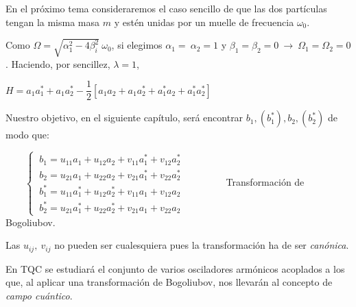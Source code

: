 \vspace{5mm}
\begin{ejercicio}
En el próximo tema consideraremos el caso sencillo de que las dos partículas tengan la misma masa $m$ y estén unidas por un muelle de frecuencia $\omega_0$.

Como $\Omega=\sqrt{\alpha_1^2-4\beta_i^2}\ \omega_0$, si elegimos $\alpha_1=\ \alpha_2=1$ y $\beta_1=\beta_2=0 \ \to \ \Omega_1=\Omega_2=0$. Haciendo, por sencillez, $\lambda=1$,

 $H=a_1a_1^*+a_1a_2^*-\dfrac 1 2 [a_1a_2+a_1a_2^*+a_1^*a_2+a_1^*a_2^*]$
 
 Nuestro objetivo, en el siguiente capítulo, será encontrar $b_1, (b_1^*), b_2, (b_2^*)$ de modo que:
 
$\qquad  \begin{cases}
 \ b_1=u_{11}a_1+u_{12}a_2+v_{11}a_1^*+v_{12}a_2^* \\
 \ b_2=u_{21}a_1+u_{22}a_2+v_{21}a_1^*+v_{22}a_2^* \\  
 \ b_1^*=u_{11}a_1^*+u_{12}a_2^*+v_{11}a_1+v_{12}a_2 \\
 \ b_2^*=u_{21}a_1^*+u_{22}a_2^*+v_{21}a_1+v_{22}a_2  	
 \end{cases}\qquad \qquad $ Transformación de Bogoliubov.

Las $u_{ij},\ v_{ij}$ no pueden ser cualesquiera pues la transformación ha de ser \emph{canónica}.
\end{ejercicio}

\vspace{5mm}

\begin{ejemplo} En TQC se estudiará el conjunto de varios osciladores armónicos acoplados a los que, al aplicar una transformación de Bogoliubov, nos llevarán al concepto de \emph{campo cuántico}. \end{ejemplo}







